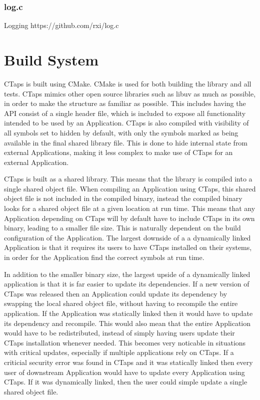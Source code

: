 \subsubsection{log.c}
Logging
https://github.com/rxi/log.c

\section{Build System}
CTaps is built using CMake. CMake is used for both building the library
and all tests.
CTaps mimics other open source libraries such as libuv as much as possible,
in order to make the structure as familiar as possible. This includes
having the API consist of a single header file,  which
is included to expose all functionality intended to be used by an Application.
CTaps is also compiled with visibility of all symbols set to hidden by default,
with only the symbols marked as  being available in the final
shared library file. This is done to hide internal state from external Applications,
making it less complex to make use of CTaps for an external Application.

CTaps is built as a shared library. This means that the library is compiled
into a single shared object file. When compiling an Application using CTaps,
this shared object file is not included in the compiled binary, instead the
compiled binary looks for a shared object file at a given location at
run time. This means that any Application depending on CTaps will by default
have to include CTaps in its own binary, leading to a smaller file size. This
is naturally dependent on the build configuration of the Application. 
The largest downside of a a dynamically
linked Application is that it requires its users to have CTaps installed on their
systems, in order for the Application find the correct symbols at run time.

In addition to the smaller binary size, the largest upside of a dynamically
linked application is that it is far easier to update its dependencies.
If a new version of CTaps was released then an Application could update
its dependency by swapping the local shared object file, without having
to recompile the entire application. If the Application was statically linked
then it would have to update its dependency and recompile. This would also mean
that the entire Application would have to be redistributed, instead of simply
having users update their CTaps installation whenever needed. This becomes
very noticable in situations with critical updates, especially if multiple
applications rely on CTaps. If a criticial security error was found in CTaps
and it was statically linked
then every user of downstream Application would have to update every Application
using CTaps. If it was dynamically linked, then the user could simple update
a single shared object file.

